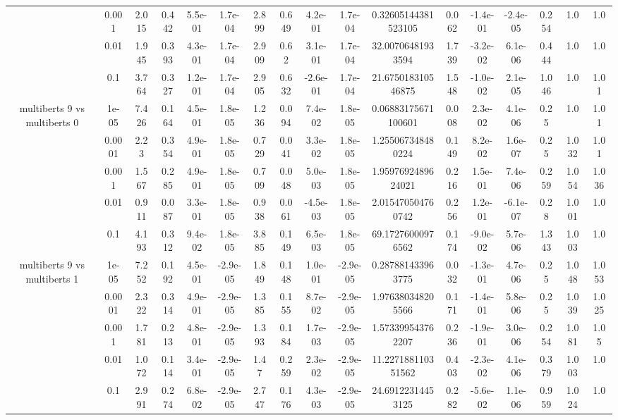 \begin{tabular}{|c|c|c|c|c|c|c|c|c|c|c|c|c|c|c|c|c|}
 & 0.001 & 2.015 & 0.442 & 5.5e-01 & 1.7e-04 & 2.899 & 0.649 & 4.2e-01 & 1.7e-04 & 0.32605144381523105 & 0.062 & -1.4e-01 & -2.4e-05 & 0.254 & 1.0 & 1.0 \\
 & 0.01 & 1.945 & 0.393 & 4.3e-01 & 1.7e-04 & 2.909 & 0.62 & 3.1e-01 & 1.7e-04 & 32.00706481933594 & 1.739 & -3.2e-02 & 6.1e-06 & 0.444 & 1.0 & 1.0 \\
 & 0.1 & 3.764 & 0.327 & 1.2e-01 & 1.7e-04 & 2.905 & 0.632 & -2.6e-01 & 1.7e-04 & 21.675018310546875 & 1.548 & -1.0e-02 & 2.1e-05 & 1.046 & 1.0 & 1.01 \\
\hline
\multirow{5}{*}{multiberts 9 vs multiberts 0} & 1e-05 & 7.426 & 0.164 & 4.5e-01 & 1.8e-05 & 1.236 & 0.094 & 7.4e-02 & 1.8e-05 & 0.06883175671100601 & 0.008 & 2.3e-02 & 4.1e-06 & 0.25 & 1.0 & 1.01 \\
 & 0.0001 & 2.23 & 0.354 & 4.9e-01 & 1.8e-05 & 0.729 & 0.041 & 3.3e-02 & 1.8e-05 & 1.255067348480224 & 0.149 & 8.2e-02 & 1.6e-07 & 0.25 & 1.032 & 1.01 \\
 & 0.001 & 1.567 & 0.285 & 4.9e-01 & 1.8e-05 & 0.709 & 0.048 & 5.0e-03 & 1.8e-05 & 1.9597692489624021 & 0.216 & 1.5e-01 & 7.4e-06 & 0.259 & 1.054 & 1.036 \\
 & 0.01 & 0.911 & 0.087 & 3.3e-01 & 1.8e-05 & 0.938 & 0.061 & -4.5e-03 & 1.8e-05 & 2.015470504760742 & 0.256 & 1.2e-01 & -6.1e-07 & 0.28 & 1.001 & 1.0 \\
 & 0.1 & 4.193 & 0.312 & 9.4e-02 & 1.8e-05 & 3.885 & 0.149 & 6.5e-03 & 1.8e-05 & 69.17276000976562 & 0.174 & -9.0e-02 & 5.7e-06 & 1.343 & 1.003 & 1.0 \\
\hline
\multirow{5}{*}{multiberts 9 vs multiberts 1} & 1e-05 & 7.252 & 0.192 & 4.5e-01 & -2.9e-05 & 1.849 & 0.148 & 1.0e-01 & -2.9e-05 & 0.287881433963775 & 0.032 & -1.3e-01 & 4.7e-06 & 0.25 & 1.048 & 1.053 \\
 & 0.0001 & 2.322 & 0.314 & 4.9e-01 & -2.9e-05 & 1.385 & 0.155 & 8.7e-02 & -2.9e-05 & 1.976380348205566 & 0.171 & -1.4e-01 & 5.8e-06 & 0.25 & 1.039 & 1.025 \\
 & 0.001 & 1.781 & 0.213 & 4.8e-01 & -2.9e-05 & 1.393 & 0.184 & 1.7e-03 & -2.9e-05 & 1.573399543762207 & 0.236 & -1.9e-01 & 3.0e-06 & 0.254 & 1.081 & 1.05 \\
 & 0.01 & 1.072 & 0.114 & 3.4e-01 & -2.9e-05 & 1.47 & 0.259 & 2.3e-02 & -2.9e-05 & 11.227188110351562 & 0.403 & -2.3e-02 & 4.1e-06 & 0.379 & 1.003 & 1.0 \\
 & 0.1 & 2.991 & 0.274 & 6.8e-02 & -2.9e-05 & 2.747 & 0.176 & 4.3e-03 & -2.9e-05 & 24.69122314453125 & 0.282 & -5.6e-02 & 1.1e-06 & 0.959 & 1.024 & 1.0 \\

\end{tabular}
